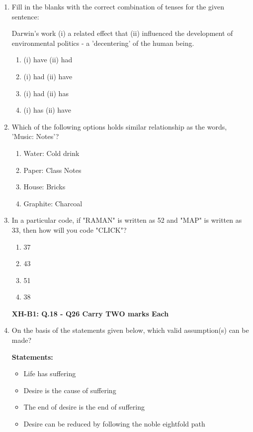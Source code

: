 \documentclass[journal,12pt,onecolumn]{exam}
\theoremstyle{remark}
\begin{document}
\begin{enumerate}
\item Fill in the blanks with the correct combination of tenses for the given sentence:

    Darwin's work (i) \underline{\hspace{2cm}} a related effect that (ii) \underline{\hspace{2cm}} influenced the development of environmental politics - a 'decentering' of the human being.

    \begin{enumerate}[label=\alph*)]
        \item (i) have (ii) had
        \item (i) had (ii) have
        \item (i) had (ii) has
        \item (i) has (ii) have
    \end{enumerate}

\item Which of the following options holds similar relationship as the words, 'Music: Notes'?
\begin{enumerate}
    \item Water: Cold drink
    \item Paper: Class Notes
    \item House: Bricks
    \item Graphite: Charcoal
\end{enumerate}
\newpage

\item In a particular code, if "RAMAN" is written as 52 and "MAP" is written as 33, then how will you code "CLICK"?
\begin{enumerate}
    \item 37
    \item 43
    \item 51
    \item 38
\end{enumerate}

\vspace{1em}

\textbf{XH-B1: Q.18 - Q26 Carry TWO marks Each}\\

\item On the basis of the statements given below, which valid assumption(s) can be made?

\textbf{Statements:}
\begin{itemize}
    \item Life has suffering
    \item Desire is the cause of suffering
    \item The end of desire is the end of suffering
    \item Desire can be reduced by following the noble eightfold path
\end{itemize}


\end{enumerate}
\end{document}
